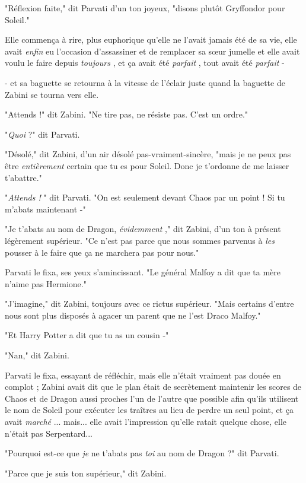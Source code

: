 "Réflexion faite," dit Parvati d'un ton joyeux, "disons plutôt Gryffondor pour Soleil."

Elle commença à rire, plus euphorique qu'elle ne l'avait jamais été de sa vie, elle avait \emph{enfin}  eu l'occasion d'assassiner et de remplacer sa sœur jumelle et elle avait voulu le faire depuis \emph{toujours} , et ça avait été \emph{parfait} , tout avait été \emph{parfait}  -

- et sa baguette se retourna à la vitesse de l'éclair juste quand la baguette de Zabini se tourna vers elle.

"Attends !" dit Zabini. "Ne tire pas, ne résiste pas. C'est un ordre."

"\emph{Quoi}  ?" dit Parvati.

"Désolé," dit Zabini, d'un air désolé pas-vraiment-sincère, "mais je ne peux pas être \emph{entièrement}  certain que tu es pour Soleil. Donc je t'ordonne de me laisser t'abattre."

"\emph{Attends !} " dit Parvati. "On est seulement devant Chaos par un point ! Si tu m'abats maintenant -"

"Je t'abats au nom de Dragon, \emph{évidemment} ," dit Zabini, d'un ton à présent légèrement supérieur. "Ce n'est pas parce que nous sommes parvenus à \emph{les}  pousser à le faire que ça ne marchera pas pour nous."

Parvati le fixa, ses yeux s'amincissant. "Le général Malfoy a dit que ta mère n'aime pas Hermione."

"J'imagine," dit Zabini, toujours avec ce rictus supérieur. "Mais certains d'entre nous sont plus disposés à agacer un parent que ne l'est Draco Malfoy."

"Et Harry Potter a dit que tu as un cousin -"

"Nan," dit Zabini.

Parvati le fixa, essayant de réfléchir, mais elle n'était vraiment pas douée en complot ; Zabini avait dit que le plan était de secrètement maintenir les scores de Chaos et de Dragon aussi proches l'un de l'autre que possible afin qu'ils utilisent le nom de Soleil pour exécuter les traîtres au lieu de perdre un seul point, et ça avait \emph{marché} ... mais... elle avait l'impression qu'elle ratait quelque chose, elle n'était pas Serpentard...

"Pourquoi est-ce que \emph{je}  ne t'abats pas \emph{toi}  au nom de Dragon ?" dit Parvati.

"Parce que je suis ton supérieur," dit Zabini.

